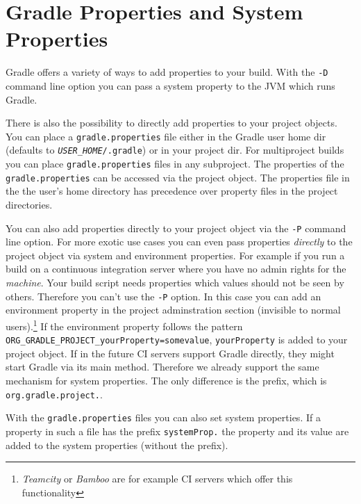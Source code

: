 \section{Gradle Properties and System Properties} %
\label{sec:gradle_properties_and_system_properties}
Gradle offers a variety of ways to add properties to your build. With the \texttt{-D} command line option you can pass a system property to the JVM which runs Gradle. 

There is also the possibility to directly add properties to your project objects. You can place a \texttt{gradle.properties} file either in the Gradle user home dir (defaults to \texttt{\emph{USER\_HOME}/.gradle}) or in your project dir. For multiproject builds you can place \texttt{gradle.properties} files in any subproject. The properties of the \texttt{gradle.properties} can be accessed via the project object. The properties file in the the user's home directory has precedence over property files in the project directories. 

You can also add properties directly to your project object via the \texttt{-P} command line option. For more exotic use cases you can even pass properties \emph{directly} to the project object via system and environment properties. For example if you run a build on a continuous integration server where you have no admin rights for the \emph{machine}. Your build script needs properties which values should not be seen by others. Therefore you can't use the \texttt{-P} option. In this case you can add an environment property in the project adminstration section (invisible to normal users).\footnote{\emph{Teamcity} or \emph{Bamboo} are for example CI servers which offer this functionality} If the environment property follows the pattern \texttt{ORG\_GRADLE\_PROJECT\_yourProperty=somevalue}, \texttt{yourProperty} is added to your project object. If in the future CI servers support Gradle directly, they might start Gradle via its main method. Therefore we already support the same mechanism for system properties. The only difference is the prefix, which is \texttt{org.gradle.project.}.

With the \texttt{gradle.properties} files you can also set system properties. If a property in such a file has the prefix \texttt{systemProp.} the property and its value are added to the system properties (without the prefix).
